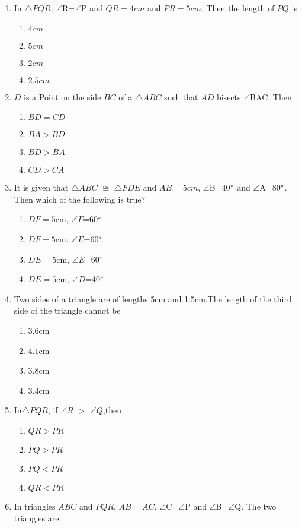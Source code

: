 \documentclass{article}
\begin{document}
\begin{enumerate}
\begin{enumerate}
\end{enumerate}
\item In $\triangle PQR$, $\angle$R=$\angle$P and $QR=4cm$ and $PR=5cm$. Then the length of $PQ$ is
\begin{enumerate}
\item $4cm$
\item $5cm$
\item $2cm$
\item $2.5cm$
\end{enumerate}
\item $D$ is a Point on the side $BC$ of a $\triangle ABC$ such that $AD$ bisects $\angle$BAC. Then
\begin{enumerate}
\item $BD=CD$
\item $BA>BD$
\item $BD>BA$
\item $CD>CA$
\end{enumerate}
\item It is given that $\triangle ABC$ $\cong$ $\triangle FDE$ and $AB=5cm$, $\angle$B=40$\degree$ and $\angle$A=80$\degree$. Then which of the following is true?
\begin{enumerate}
\item $DF=5$cm, $\angle F$=60$\degree$
\item $DF=5$cm, $\angle E$=60$\degree$
\item $DE=5$cm, $\angle E$=60$\degree$	
\item $DE=5$cm, $\angle D$=40$\degree$
\end{enumerate}		
\item Two sides of a triangle are of lengths 5cm and 1.5cm.The length of the third side of the triangle cannot be
\begin{enumerate}
\item $3.6$cm
\item $4.1$cm
\item $3.8$cm
\item $3.4$cm
\end{enumerate}
\item In$\triangle PQR$, if $\angle R$ $>$ $\angle Q$,then
\begin{enumerate}
\item $QR > PR$
\item $PQ > PR$
\item $PQ < PR$
\item $QR < PR$
\end{enumerate}
\item In triangles $ABC$ and $PQR$, $AB=AC$, $\angle$C=$\angle$P and $\angle$B=$\angle$Q. The two triangles are

\end{enumerate}
\end{document}
